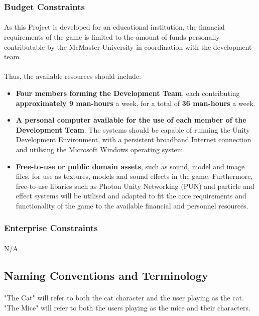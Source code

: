 \documentclass[12pt, titlepage]{article}
\begin{document}
\subsubsection{Budget Constraints}
\paragraph{}As this Project is developed for an educational institution, the financial requirements of the game is limited to the amount of funds personally contributable by the McMaster University in coordination with the development team.
\paragraph{}Thus, the available resources should include: 
\begin{itemize}
    \item \textbf{Four members forming the Development Team}, each contributing \textbf{approximately 9 man-hours} a week, for a total of \textbf{36 man-hours} a week.
    \item \textbf{A personal computer available for the use of each member of the Development Team}. The systems should be capable of running the Unity Development Environment, with a persistent broadband Internet connection and utilising the Microsoft Windows operating system.
    \item \textbf{Free-to-use or public domain assets}, such as sound, model and image  files, for use as textures, models and sound effects in the game. Furthermore, free-to-use libaries such as Photon Unity Networking (PUN) and particle and effect systems will be utilised and adapted to fit the core requirements and functionality of the game to the available financial and personnel resources.
    
\end{itemize}
\subsubsection{Enterprise Constraints}
\paragraph{}N/A
\subsection{Naming Conventions and Terminology}
\paragraph{}"The Cat" will refer to both the cat character and the user playing as the cat. "The Mice" will refer to both the users playing as the mice and their characters.
\end{document}
